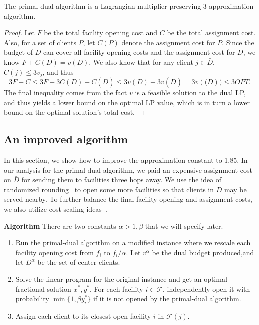 \begin{thm}
The primal-dual algorithm is a Lagrangian-multiplier-preserving 3-approximation algorithm.
\end{thm}
\begin{proof}
Let $F$ be the total facility opening cost and $C$ be the total assignment cost.
Also, for a set of clients $P$, let $C(P)$ denote the assignment cost for $P$.
Since the budget of $D$ can cover all facility opening costs and the assignment cost for $D$, we know
$F + C(D) = v(D)$.
We also know that for any client $j \in \bar D$, $C(j) \le 3 v_j$, and thus
\[  3F + C \le 3F + 3C(D) + C(\bar D) \le 3v(D) + 3v(\bar D) = 3v(\mathcal(D)) \le 3 OPT. \]
The final inequality comes from the fact $v$ is a feasible solution to the dual LP, and thus yields a lower bound on the optimal LP value, which is in turn a lower bound on the optimal solution's total cost.
\end{proof}

\subsection{An improved algorithm}

In this section, we show how to improve the approximation constant to 1.85. In our analysis for the primal-dual algorithm, we paid an expensive assignment cost on $\bar D$ for sending them to facilities three hops away. We use the idea of randomized rounding~\cite{chudak2003improved} to open some more facilities so that clients in $\bar D$ may be served nearby. To further balance the final facility-opening and assignment costs, we also utilize cost-scaling ideas~\cite{charikar2005improved}.

\textbf{Algorithm}
There are two constants $\alpha > 1, \beta$ that we will specify later.

\begin{enumerate}
\item Run the primal-dual algorithm on a modified instance
where we rescale each facility opening cost from $f_i$ to $f_i/\alpha$.
Let $v^\alpha$ be the dual budget produced,and let $D^\alpha$ be the set of center clients.
\item Solve the linear program for the original instance and get an optimal fractional solution $x^*, y^*$.
For each facility $i \in \mathcal{F}$, independently open it with probability $\min\{1, \beta y^*_i\}$
if it is not opened by the primal-dual algorithm.
\item Assign each client to its closest open facility $i$ in $\mathcal{F}(j)$.
\end{enumerate}


